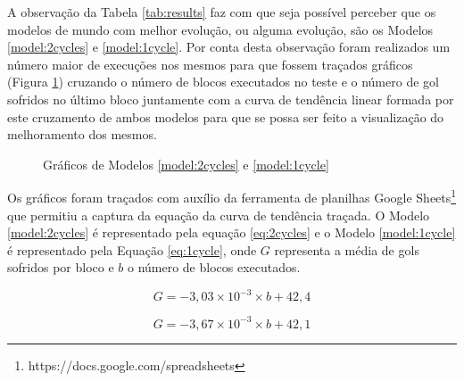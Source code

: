 
A observação da Tabela \ref{tab:results} faz com que seja possível perceber que
os modelos de mundo com melhor evolução, ou alguma evolução, são os Modelos
\ref{model:2cycles} e \ref{model:1cycle}. Por conta desta observação foram
realizados um número maior de execuções nos mesmos para que fossem 
traçados gráficos (Figura \ref{img:graph}) cruzando o número de blocos executados no teste e o número de
gol sofridos no último bloco juntamente com a curva de tendência linear formada
por este cruzamento de ambos modelos para que se possa ser feito a visualização
do melhoramento dos mesmos.

\begin{figure}[!htb]
\centering
    \caption{\label{img:graph} Gráficos de Modelos \ref{model:2cycles} e \ref{model:1cycle}}
    \qquad
    \vspace{1.5em}
\end{figure}

Os gráficos foram traçados com auxílio da ferramenta de planilhas Google Sheets\footnote{https://docs.google.com/spreadsheets} que
permitiu a captura da equação da curva de tendência traçada. O Modelo
\ref{model:2cycles} é representado pela equação \ref{eq:2cycles} e o Modelo
\ref{model:1cycle} é representado pela Equação \ref{eq:1cycle}, onde $G$
representa a média de gols sofridos por bloco e $b$ o número de blocos executados.

\begin{equation}
    \label{eq:2cycles}
    G=-3,03\times 10^{-3}\times b+42,4
\end{equation}

\begin{equation}
    \label{eq:1cycle}
    G=-3,67\times 10^{-3} \times b+42,1
\end{equation}